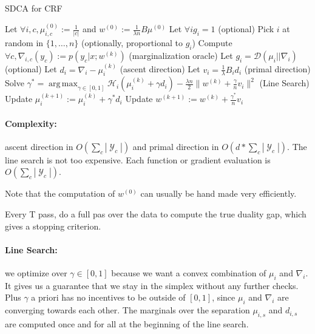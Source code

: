 \documentclass{article}
\DeclareMathOperator{\1}{\mathbb{1}}
\DeclareMathOperator{\Y}{\mathcal{Y}}
\DeclareMathOperator*{\argmax}{arg\,max}
\begin{document}
\begin{algorithm}[ht]
    \caption{SDCA for CRF}%
    \label{sdca for crf}
\begin{algorithmic}
        \STATE Let $\forall i, c, \mu_{i, c}^{(0)} := \frac{1}{|c|}$ and $w^{(0)} := \frac{1}{\lambda n} B \mu^{(0)} $
        \STATE Let $\forall i g_i = 1$ (optional)
                \STATE Pick $i$ at random in $\{1,\ldots,n\}$ (optionally, proportional to $g_i$)
                \STATE Compute $\forall c, \nabla_{i, c} (y_c) := p(y_c|x; w^{(k)})$ (marginalization oracle)
                \STATE Let $g_i = \mathcal D(\mu_i || \nabla_i)$ (optional)
                \STATE Let $d_i = \nabla_i - \mu_i^{(k)}$ (ascent direction)
                \STATE Let $v_i = \frac{1}{\lambda} B_i d_i $ (primal direction)
                \STATE Solve $\gamma^* = \argmax_{\gamma \in [0,1]} \mathcal H_i(\mu_i^{(k)} + \gamma d_i) - \frac{\lambda n}{2} \| w^{(k)} + \frac{\gamma}{n} v_i \|^2$ (Line Search)
               \STATE Update $\mu_i^{(k+1)} := \mu_i^{(k)} + \gamma^* d_i$
               \STATE Update $w^{(k+1)} := w^{(k)} + \frac{\gamma^*}{n} v_i $
        \ENDFOR
\end{algorithmic}
\end{algorithm}

\paragraph{Complexity:} ascent direction in $O(\sum_c |\Y_c|)$ and primal direction in $O(d*\sum_c |\Y_c|)$.
The line search is not too expensive.
Each function or gradient evaluation is $O(\sum_c |\Y_c|)$.

Note that the computation of $w^{(0)}$ can usually be hand made very efficiently.

Every T pass, do a full pas over the data to compute the true duality gap, which gives a stopping criterion.

\paragraph{Line Search:} we optimize over $\gamma \in [0,1]$ because we want a convex combination of $\mu_i$ and $\nabla_i$.
It gives us a guarantee that we stay in the simplex without any further checks.
Plus $\gamma$ a priori has no incentives to be outside of $[0,1]$, since $\mu_i$ and $\nabla_i$ are converging towards each other.
The marginals over the separation $\mu_{i, s}$ and $d_{i, s}$ are computed once and for all at the beginning of the line search.
\end{document}
